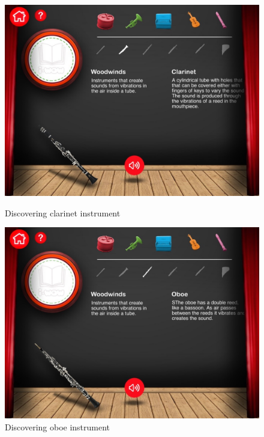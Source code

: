 \begin{figure}[ht!]
  \centering
  \includegraphics[width=350pt]{graphics/additional-screens/discovering_wind_clarinet_screen.jpg}
  \vspace{0.05cm}
  \caption{Discovering clarinet instrument}
  \vspace{0.6cm}

  \includegraphics[width=350pt]{graphics/additional-screens/discovering_wind_oboe_screen.jpg}
  \vspace{0.05cm}
  \caption{Discovering oboe instrument}
\end{figure}

